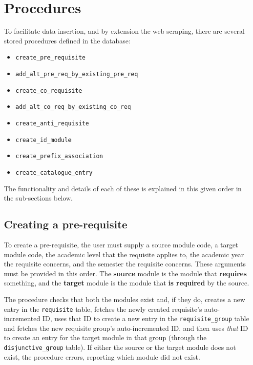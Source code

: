 \section{Procedures}
To facilitate data insertion, and by extension the web scraping, there are
several stored procedures defined in the database:
\begin{itemize}
    \item \texttt{create\_pre\_requisite}
    \item \texttt{add\_alt\_pre\_req\_by\_existing\_pre\_req}
    \item \texttt{create\_co\_requisite}
    \item \texttt{add\_alt\_co\_req\_by\_existing\_co\_req}
    \item \texttt{create\_anti\_requisite}
    \item \texttt{create\_id\_module}
    \item \texttt{create\_prefix\_association}
    \item \texttt{create\_catalogue\_entry}
\end{itemize}
The functionality and details of each of these is explained in this given order
in the sub-sections below.

    \subsection{Creating a pre-requisite}
    To create a pre-requisite, the user must supply a source module code, a
    target module code, the academic level that the requisite applies to, the
    academic year the requisite concerns, and the semester the requisite
    concerns. These arguments must be provided in this order. The
    \textbf{source} module is the module that \textbf{requires} something, and
    the \textbf{target} module is the module that \textbf{is required} by the
    source.
    
    The procedure checks that both the modules exist and, if they do, creates
    a new entry in the \texttt{requisite} table, fetches the newly created
    requisite's auto-incremented ID, uses that ID to create a new entry in the
    \texttt{requisite\_group} table and fetches the new requisite group's
    auto-incremented ID, and then uses \textit{that} ID to create an entry for
    the target module in that group (through the \texttt{disjunctive\_group}
    table). If either the source or the target module does not exist, the
    procedure errors, reporting which module did not exist.
    \\
    
